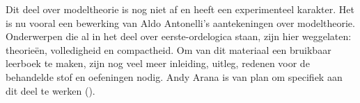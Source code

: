 \documentclass[../../include/open-logic-part]{subfiles}
\begin{document}

\begin{editorial}
  Dit deel over modeltheorie is nog niet af en heeft een experimenteel
  karakter. Het is nu vooral een bewerking van Aldo Antonelli's aantekeningen
  over modeltheorie. Onderwerpen die al in het deel over eerste-ordelogica
  staan, zijn hier weggelaten: theorieën, volledigheid en compactheid. Om van
  dit materiaal een bruikbaar leerboek te maken, zijn nog veel meer inleiding,
  uitleg, redenen voor de behandelde stof en oefeningen nodig. Andy Arana is
  van plan om specifiek aan dit deel te werken ().
\end{editorial}





\OLEndPartHook
\end{document}
